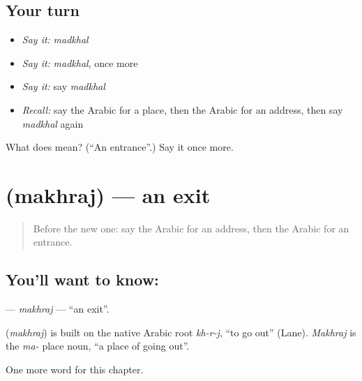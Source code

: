 \subsection*{Your turn}
\begin{itemize}
\raggedright
  \item \emph{Say it:} \emph{madkhal}
  \item \emph{Say it:} \emph{madkhal}, once more
  \item \emph{Say it:} say \emph{madkhal}
  \item \emph{Recall:} say the Arabic for a place, then the Arabic for an address, then say \emph{madkhal} again
\end{itemize}

\begin{tcolorbox}[breakable,colback=teal!4,colframe=teal!35!black,title={Before you move on}]
What does  mean? (\textquotedblleft{}An entrance\textquotedblright{}.) Say it once more.
\end{tcolorbox}
\section[\texorpdfstring{\ar{مخرج} (makhraj)}{مخرج (makhraj)}]{ (makhraj) — an exit}

\label{lesson:AR-C105-makhraj}



\begin{quote}
Before the new one: say the Arabic for an address, then the Arabic for an entrance.
\end{quote}

\subsection*{You'll want to know: }
\textbf{} — \emph{makhraj} — \textquotedblleft{}an exit\textquotedblright{}.

\begin{cousinweb}
\textbf{} (\emph{makhraj}) is built on the native Arabic root \emph{kh-r-j}, \textquotedblleft{}to go out\textquotedblright{} (Lane). \emph{Makhraj} is the \emph{ma-} place noun, \textquotedblleft{}a place of going out\textquotedblright{}.
\end{cousinweb}

\begin{grammarlens}[title={What you've built}]
One more word for this chapter.
\end{grammarlens}

